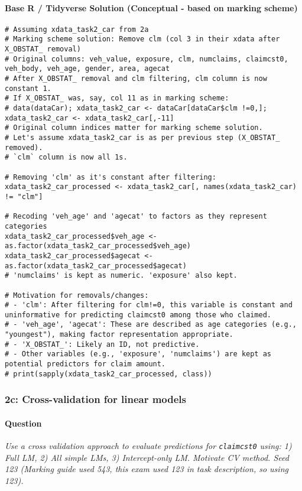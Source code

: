 \documentclass[12pt,a4paper]{article}
\newcommand{\Rcode}[1]{\texttt{#1}} %
\begin{document}
        \paragraph{Base R / Tidyverse Solution (Conceptual - based on marking scheme)}
\begin{lstlisting}[]
# Assuming xdata_task2_car from 2a
# Marking scheme solution: Remove clm (col 3 in their xdata after X_OBSTAT_ removal)
# Original columns: veh_value, exposure, clm, numclaims, claimcst0, veh_body, veh_age, gender, area, agecat
# After X_OBSTAT_ removal and clm filtering, clm column is now constant 1.
# If X_OBSTAT_ was, say, col 11 as in marking scheme:
# data(dataCar); xdata_task2_car <- dataCar[dataCar$clm !=0,]; xdata_task2_car <- xdata_task2_car[,-11]
# Original column indices matter for marking scheme solution.
# Let's assume xdata_task2_car is as per previous step (X_OBSTAT_ removed).
# `clm` column is now all 1s.

# Removing 'clm' as it's constant after filtering:
xdata_task2_car_processed <- xdata_task2_car[, names(xdata_task2_car) != "clm"]

# Recoding 'veh_age' and 'agecat' to factors as they represent categories
xdata_task2_car_processed$veh_age <- as.factor(xdata_task2_car_processed$veh_age)
xdata_task2_car_processed$agecat <- as.factor(xdata_task2_car_processed$agecat)
# 'numclaims' is kept as numeric. 'exposure' also kept.

# Motivation for removals/changes:
# - 'clm': After filtering for clm!=0, this variable is constant and uninformative for predicting claimcst0 among those who claimed.
# - 'veh_age', 'agecat': These are described as age categories (e.g., "youngest"), making factor representation appropriate.
# - 'X_OBSTAT_': Likely an ID, not predictive.
# - Other variables (e.g., 'exposure', 'numclaims') are kept as potential predictors for claim amount.
# print(sapply(xdata_task2_car_processed, class))
\end{lstlisting}

    \subsubsection{2c: Cross-validation for linear models}
        \paragraph{Question}
        \textit{Use a cross validation approach to evaluate predictions for \Rcode{claimcst0} using: 1) Full LM, 2) All simple LMs, 3) Intercept-only LM. Motivate CV method. Seed 123 (Marking guide used 543, this exam used 123 in task description, so using 123).}
\end{document}
